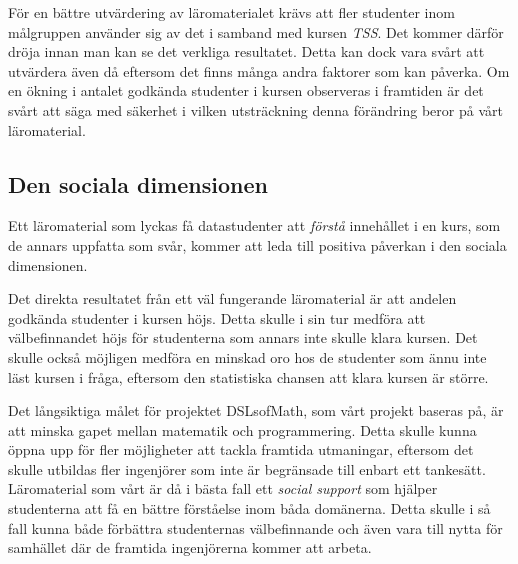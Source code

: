 \documentclass[12pt,a4paper,twoside,openright]{article}
\begin{document}
För en bättre utvärdering av läromaterialet krävs att fler studenter
inom målgruppen använder sig av det i samband med kursen
\textit{TSS}. Det kommer därför dröja innan man kan se det verkliga
resultatet. Detta kan dock vara svårt att utvärdera även då eftersom
det finns många andra faktorer som kan påverka. Om en ökning i
antalet godkända studenter i kursen observeras i framtiden är det
svårt att säga med säkerhet i vilken utsträckning denna förändring
beror på vårt läromaterial.


\subsection{Den sociala dimensionen}

Ett läromaterial som lyckas få datastudenter att \emph{förstå}
innehållet i en kurs, som de annars uppfatta som svår, kommer att leda
till positiva påverkan i den sociala dimensionen. %

Det direkta resultatet från ett väl fungerande läromaterial är att
andelen godkända studenter i kursen höjs. Detta skulle i sin tur
medföra att välbefinnandet höjs för studenterna som annars inte
skulle klara kursen. Det skulle också möjligen medföra en minskad oro
hos de studenter som ännu inte läst kursen i fråga, eftersom den
statistiska chansen att klara kursen är större.

Det långsiktiga målet för projektet DSLsofMath, som vårt projekt baseras på, är att minska
gapet mellan matematik och programmering. %
Detta skulle kunna öppna upp för fler möjligheter att
tackla framtida utmaningar, eftersom det skulle utbildas fler
ingenjörer som inte är begränsade till enbart ett tankesätt.
Läromaterial som vårt  är då i bästa fall ett \emph{social support} %
som hjälper studenterna att få en bättre förståelse inom båda domänerna. Detta
skulle i så fall kunna både förbättra studenternas välbefinnande och
även vara till nytta för samhället där de framtida ingenjörerna
kommer att arbeta.
\end{document}
